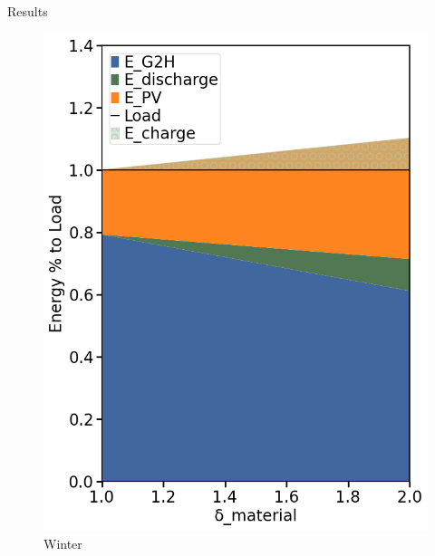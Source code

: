 \begin{frame}[c]{Results}
\begin{itemize}
\begin{figure}[htbp]
                \begin{minipage}{0.24\linewidth}
                    \includegraphics[width=\linewidth]{Figures/winter.png}
                    \caption{Winter}
                \end{minipage}\hfill%
                \begin{minipage}{0.24\linewidth}

\end{minipage}
\end{figure}
\end{itemize}
\end{frame}
